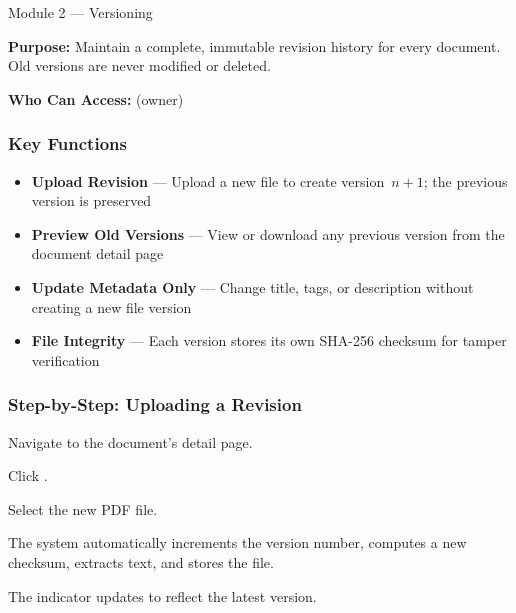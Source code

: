 \vspace{10pt}

\begin{ugModule}{Module 2 --- Versioning}

  \textbf{Purpose:}
  Maintain a complete, immutable revision history for every
  document. Old versions are never modified or deleted.

  \textbf{Who Can Access:}
     (owner)

  \subsubsection*{Key Functions}
  \begin{itemize}[leftmargin=18pt]
    \item \textbf{Upload Revision} --- Upload a new file to
      create version~$n+1$; the previous version is preserved
    \item \textbf{Preview Old Versions} --- View or download
      any previous version from the document detail page
    \item \textbf{Update Metadata Only} --- Change title, tags,
      or description without creating a new file version
    \item \textbf{File Integrity} --- Each version stores its
      own SHA-256 checksum for tamper verification
  \end{itemize}

  \subsubsection*{Step-by-Step: Uploading a Revision}
  \begin{ugSteps}
    \item Navigate to the document's detail page.
    \item Click .
    \item Select the new PDF file.
    \item The system automatically increments the version number,
          computes a new checksum, extracts text, and stores the
          file.
    \item The  indicator updates to
          reflect the latest version.
  \end{ugSteps}


\end{ugModule}
